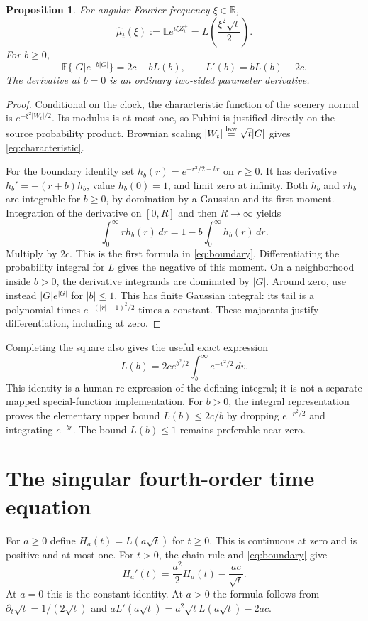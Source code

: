 \documentclass[11pt]{article}
\newtheorem{proposition}[theorem]{Proposition}
\newcommand{\R}{\mathbb R}
\newcommand{\E}{\mathbb E}
\begin{document}
\begin{proposition}\label{prop:transform}
For angular Fourier frequency $\xi\in\R$,
\begin{equation}\label{eq:characteristic}
 \widehat\mu_t(\xi):=\E e^{i\xi Z_t^\pm}
 =L\left(\frac{\xi^2\sqrt t}{2}\right).
\end{equation}
For $b\geq0$,
\begin{equation}\label{eq:boundary}
 \E\{|G|e^{-b|G|}\}=2c-bL(b),\qquad
 L'(b)=bL(b)-2c.
\end{equation}
The derivative at $b=0$ is an ordinary two-sided parameter derivative.
\end{proposition}
\begin{proof}
Conditional on the clock, the characteristic function of the scenery
normal is $e^{-\xi^2|W_t|/2}$. Its modulus is at most one, so Fubini
is justified directly on the source probability product. Brownian
scaling $|W_t|\stackrel{\rm law}=\sqrt t|G|$ gives
\eqref{eq:characteristic}.

For the boundary identity set $h_b(r)=e^{-r^2/2-br}$ on $r\geq0$.
It has derivative $h_b'=-(r+b)h_b$, value $h_b(0)=1$, and limit
zero at infinity. Both $h_b$ and $rh_b$ are integrable for $b\geq0$,
by domination by a Gaussian and its first moment. Integration of the
derivative on $[0,R]$ and then $R\to\infty$ yields
\[
 \int_0^\infty rh_b(r)\,dr
       =1-b\int_0^\infty h_b(r)\,dr.
\]
Multiply by $2c$. This is the first formula in \eqref{eq:boundary}.
Differentiating the probability integral for $L$ gives the negative
of this moment. On a neighborhood inside $b>0$, the derivative
integrands are dominated by $|G|$. Around zero, use instead
$|G|e^{|G|}$ for $|b|\leq1$. This has finite Gaussian integral:
its tail is a polynomial times $e^{-(|r|-1)^2/2}$ times a constant.
These majorants justify differentiation, including at zero.
\end{proof}

Completing the square also gives the useful exact expression
\[
 L(b)=2c e^{b^2/2}\int_b^\infty e^{-v^2/2}\,dv.
\]
This identity is a human re-expression of the defining integral;
it is not a separate mapped special-function implementation.
For $b>0$, the integral representation proves the elementary upper
bound $L(b)\leq2c/b$ by dropping $e^{-r^2/2}$ and integrating
$e^{-br}$. The bound $L(b)\leq1$ remains preferable near zero.

\section{The singular fourth-order time equation}
For $a\geq0$ define $H_a(t)=L(a\sqrt t)$ for $t\geq0$.
This is continuous at zero and is positive and at most one.
For $t>0$, the chain rule and \eqref{eq:boundary} give
\begin{equation}\label{eq:timeODE}
 H_a'(t)=\frac{a^2}{2}H_a(t)-\frac{ac}{\sqrt t}.
\end{equation}
At $a=0$ this is the constant identity. At $a>0$ the formula follows
from $\partial_t\sqrt t=1/(2\sqrt t)$ and
$aL'(a\sqrt t)=a^2\sqrt t L(a\sqrt t)-2ac$.
\end{document}
